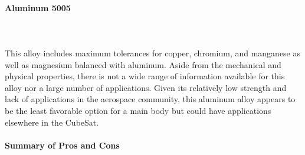 \paragraph{Aluminum 5005} ~\\~\\
This alloy includes maximum tolerances for copper, chromium, and manganese as well as magnesium balanced with aluminum. Aside from the mechanical and physical properties, there is not a wide range of information available for this alloy nor a large number of applications. Given its relatively low strength and lack of applications in the aerospace community, this aluminum alloy appears to be the least favorable option for a main body but could have applications elsewhere in the CubeSat.
%
\paragraph{Summary of Pros and Cons}\hspace{1cm} 
